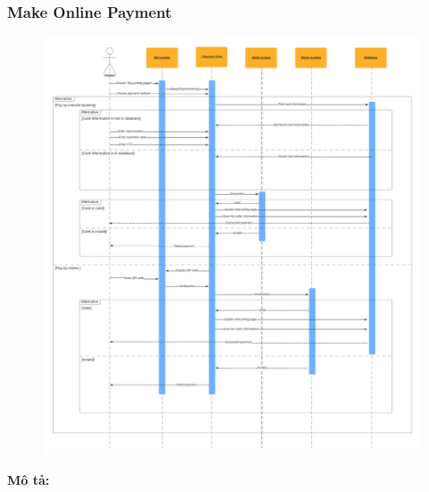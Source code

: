     \subsubsection{Make Online Payment}
    \begin{center}
    \begin{figure}[!htp]
    \begin{center}
     \includegraphics[scale=0.45]{images/Task2/SequenceDiagrams/PaymentSequence.pdf}
    \end{center}
    \label{refhinh1}
    \end{figure}
    \end{center}
        \newpage
    \textbf{Mô tả:}
